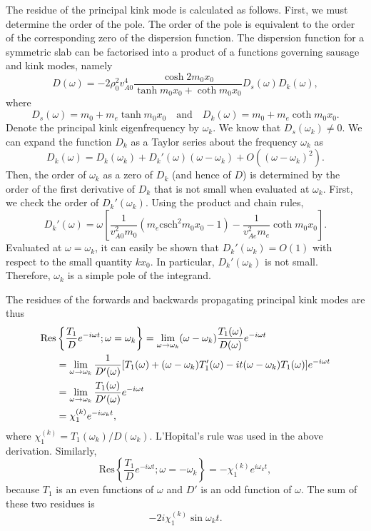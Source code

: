 The residue of the principal kink mode is calculated as follows. First, we must determine the order of the pole. The order of the pole is equivalent to the order of the corresponding zero of the dispersion function. The dispersion function for a symmetric slab can be factorised into a product of a functions governing sausage and kink modes, namely
\begin{equation}
D(\omega) = -2\rho_0^2v_{A0}^4 \frac{\cosh{2m_0x_0}}{\tanh{m_0x_0} + \coth{m_0x_0}} D_s(\omega) D_k(\omega),
\end{equation}
where
\begin{equation}
D_s(\omega) = m_0 + m_e\tanh{m_0x_0} \quad \text{and} \quad D_k(\omega) = m_0 + m_e\coth{m_0x_0}.
\end{equation}
Denote the principal kink eigenfrequency by $\omega_k$. We know that $D_s(\omega_k) \neq 0$. We can expand the function $D_k$ as a Taylor series about the frequency $\omega_k$ as
\begin{equation}
D_k(\omega) = D_k(\omega_k) + D_k'(\omega)(\omega - \omega_k) + O((\omega - \omega_k)^2).
\end{equation}
Then, the order of $\omega_k$ as a zero of $D_k$ (and hence of $D$) is determined by the order of the first derivative of $D_k$ that is not small when evaluated at $\omega_k$. First, we check the order of $D_k'(\omega_k)$. Using the product and chain rules,
\begin{equation}
D_k'(\omega) = \omega\left[ \frac{1}{v_{A0}^2m_0} (m_e\text{csch}^2{m_0x_0} - 1) - \frac{1}{v_{Ae}^2m_e}\coth{m_0x_0} \right].
\end{equation}
Evaluated at $\omega = \omega_k$, it can easily be shown that $D_k'(\omega_k) = O(1)$ with respect to the small quantity $kx_0$. In particular, $D_k'(\omega_k)$ is not small. Therefore, $\omega_k$ is a simple pole of the integrand.

The residues of the forwards and backwards propagating principal kink modes are thus
\begin{align}
\text{Res}&\left\{ \frac{T_1}{D} e^{-i\omega t} ; \omega = \omega_k \right\} = \lim_{\omega \to \omega_k} (\omega - \omega_k)\frac{T_1(\omega)}{D(\omega)} e^{-i\omega t} \notag \\
&= \lim_{\omega \to \omega_k}\frac{1}{D'(\omega)} [T_1(\omega) + (\omega - \omega_k)T_1'(\omega) - it(\omega - \omega_k)T_1(\omega)]e^{-i\omega t} \notag \\
&= \lim_{\omega \to \omega_k} \frac{T_1(\omega)}{D'(\omega)}e^{-i\omega t} \notag \\
&= \chi_1^{(k)} e^{-i\omega_k t},
\end{align}
where $\chi_1^{(k)} = T_1(\omega_k)/D(\omega_k)$. L'Hopital's rule was used in the above derivation. Similarly, 
\begin{equation}
\text{Res}\left\{ \frac{T_1}{D} e^{-i\omega t} ; \omega = -\omega_k \right\} = -\chi_1^{(k)} e^{i\omega_k t},
\end{equation}
because $T_1$ is an even functions of $\omega$ and $D'$ is an odd function of $\omega$. The sum of these two residues is
\begin{equation}
-2i\chi_1^{(k)}\sin{\omega_k t}.
\end{equation}

